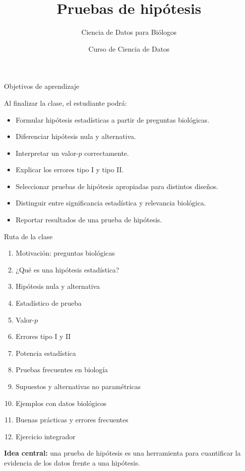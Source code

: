 \documentclass[aspectratio=169,11pt]{beamer}
\title[Pruebas de hipótesis]{Pruebas de hipótesis}
\subtitle{Ciencia de Datos para Biólogos}
\author{Curso de Ciencia de Datos}
\institute{Biología / Ciencias Naturales}
\date{}
\begin{document}

\begin{frame}
  \titlepage
\end{frame}

\begin{frame}{Objetivos de aprendizaje}

Al finalizar la clase, el estudiante podrá:

\begin{itemize}
    \item Formular hipótesis estadísticas a partir de preguntas biológicas.
    \item Diferenciar hipótesis nula y alternativa.
    \item Interpretar un valor-$p$ correctamente.
    \item Explicar los errores tipo I y tipo II.
    \item Seleccionar pruebas de hipótesis apropiadas para distintos diseños.
    \item Distinguir entre significancia estadística y relevancia biológica.
    \item Reportar resultados de una prueba de hipótesis.
\end{itemize}

\end{frame}

\begin{frame}{Ruta de la clase}

\begin{enumerate}
    \item Motivación: preguntas biológicas
    \item ¿Qué es una hipótesis estadística?
    \item Hipótesis nula y alternativa
    \item Estadístico de prueba
    \item Valor-$p$
    \item Errores tipo I y II
    \item Potencia estadística
    \item Pruebas frecuentes en biología
    \item Supuestos y alternativas no paramétricas
    \item Ejemplos con datos biológicos
    \item Buenas prácticas y errores frecuentes
    \item Ejercicio integrador
\end{enumerate}

\vspace{0.3cm}

\centering
\textbf{Idea central:} una prueba de hipótesis es una herramienta para
cuantificar
la evidencia de los datos frente a una hipótesis.

\end{frame}
\end{document}
